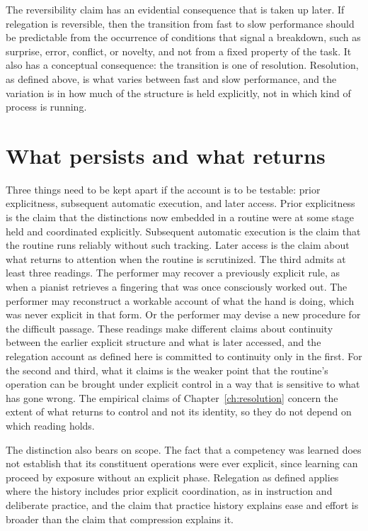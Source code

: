 \documentclass[11pt]{report}
\theoremstyle{remark}
\theoremstyle{definition}
\begin{document}
The reversibility claim has an evidential consequence that is taken up later. If relegation is reversible, then the transition from fast to slow performance should be predictable from the occurrence of conditions that signal a breakdown, such as surprise, error, conflict, or novelty, and not from a fixed property of the task. It also has a conceptual consequence: the transition is one of resolution. Resolution, as defined above, is what varies between fast and slow performance, and the variation is in how much of the structure is held explicitly, not in which kind of process is running.

\section{What persists and what returns}

Three things need to be kept apart if the account is to be testable: prior explicitness, subsequent automatic execution, and later access. Prior explicitness is the claim that the distinctions now embedded in a routine were at some stage held and coordinated explicitly. Subsequent automatic execution is the claim that the routine runs reliably without such tracking. Later access is the claim about what returns to attention when the routine is scrutinized. The third admits at least three readings. The performer may recover a previously explicit rule, as when a pianist retrieves a fingering that was once consciously worked out. The performer may reconstruct a workable account of what the hand is doing, which was never explicit in that form. Or the performer may devise a new procedure for the difficult passage. These readings make different claims about continuity between the earlier explicit structure and what is later accessed, and the relegation account as defined here is committed to continuity only in the first. For the second and third, what it claims is the weaker point that the routine's operation can be brought under explicit control in a way that is sensitive to what has gone wrong. The empirical claims of Chapter~\ref{ch:resolution} concern the extent of what returns to control and not its identity, so they do not depend on which reading holds.

The distinction also bears on scope. The fact that a competency was learned does not establish that its constituent operations were ever explicit, since learning can proceed by exposure without an explicit phase. Relegation as defined applies where the history includes prior explicit coordination, as in instruction and deliberate practice, and the claim that practice history explains ease and effort is broader than the claim that compression explains it.
\end{document}
